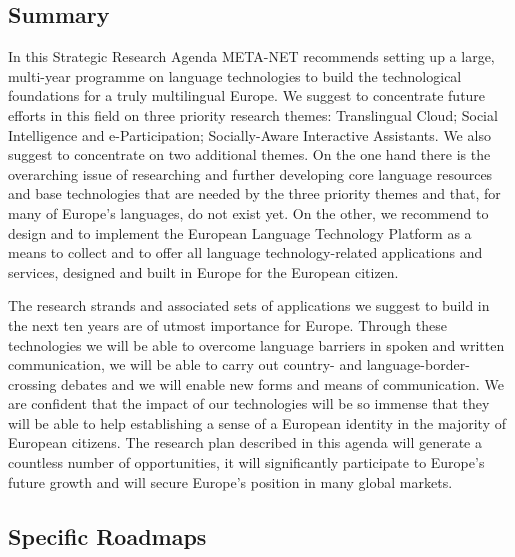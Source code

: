 \documentclass[10pt, plain]{../../metanetpaper}
\begin{document}
\clearpage

\label{sec:conclusions}

\begin{multicols}{2}

\subsection{Summary}
\label{sec:final-summary}

In this Strategic Research Agenda META-NET recommends setting up a large, multi-year programme on language technologies to build the technological foundations for a truly multilingual Europe. We suggest to concentrate future efforts in this field on three priority research themes: Translingual Cloud; Social Intelligence and e-Participation; Socially-Aware Interactive Assistants. We also suggest to concentrate on two additional themes. On the one hand there is the overarching issue of researching and further developing core language resources and base technologies that are needed by the three priority themes and that, for many of Europe's languages, do not exist yet. On the other, we recommend to design and to implement the European Language Technology Platform as a means to collect and to offer all language technology-related applications and services, designed and built in Europe for the European citizen.

The research strands and associated sets of applications we suggest to build in the next ten years are of utmost importance for Europe. Through these technologies we will be able to overcome language barriers in spoken and written communication, we will be able to carry out country- and language-border-crossing debates and we will enable new forms and means of communication. We are confident that the impact of our technologies will be so immense that they will be able to help establishing a sense of a European identity in the majority of European citizens. The research plan described in this agenda will generate a countless number of opportunities, it will significantly participate to Europe's future growth and will secure Europe's position in many global markets.

\subsection{Specific Roadmaps}
\label{sec:roadmaps}


\end{multicols}
\end{document}
